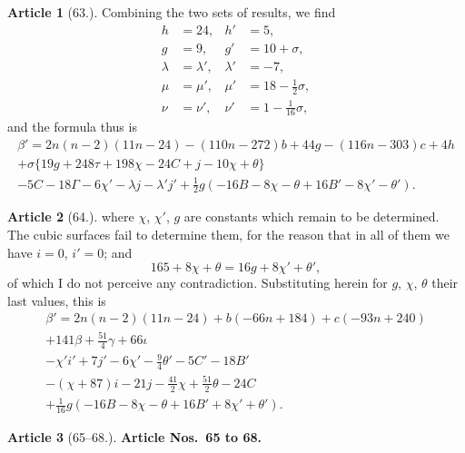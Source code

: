 \documentclass[11pt,a4paper]{article}
\theoremstyle{definition}
\newtheorem{art}{Article}
\begin{document}
\begin{art}[63.]
Combining the two sets of results, we find
\begin{align*}
h &= 24, & h' &= 5, \\
g &= 9, & g' &= 10 + \sigma, \\
\lambda &= \lambda', & \lambda' &= -7, \\
\mu &= \mu', & \mu' &= 18 - \tfrac{1}{2}\sigma, \\
\nu &= \nu', & \nu' &= 1 - \tfrac{1}{16}\sigma,
\end{align*}
and the formula thus is
\begin{multline*}
\beta' = 2n(n-2)(11n-24) - (110n - 272)b + 44g - (116n - 303)c + 4h \\
+ \sigma\{19g + 248\tau + 198\chi - 24C + j - 10\chi + \theta \} \\
- 5C - 18\Gamma - 6\chi' - \lambda j - \lambda' j' + \tfrac{1}{2}g(-16B - 8\chi - \theta + 16B' - 8\chi' - \theta').
\end{multline*}
\end{art}

\setcounter{page}{353}

\begin{art}[64.]
where $\chi$, $\chi'$, $g$ are constants which remain to be determined. The cubic surfaces fail to determine them, for the reason that in all of them we have $i = 0$, $i' = 0$; and
\[
165 + 8\chi + \theta = 16g + 8\chi' + \theta',
\]
of which I do not perceive any contradiction. Substituting herein for $g$, $\chi$, $\theta$ their last values, this is
\begin{multline*}
\beta' = 2n(n-2)(11n-24) + b(-66n+184) + c(-93n+240) \\
+ 141\beta + \tfrac{51}{4}\gamma + 66\iota \\
- \chi'i' + 7j' - 6\chi' - \tfrac{9}{4}\theta' - 5C' - 18B' \\
-(\chi+87)i - 21j - \tfrac{41}{2}\chi + \tfrac{51}{2}\theta - 24C \\
+ \tfrac{1}{16}g(-16B - 8\chi - \theta + 16B' + 8\chi' + \theta').
\end{multline*}
\end{art}

\begin{art}[65--68.]
\textbf{Article Nos.~65 to 68.}
\end{art}
\end{document}
